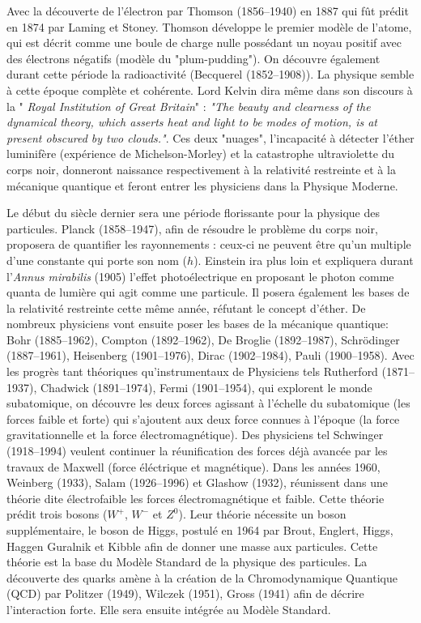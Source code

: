 Avec la découverte de l'électron par Thomson (\num{1856}--\num{1940}) en \num{1887} qui fût prédit en \num{1874} par Laming et Stoney. Thomson développe le premier modèle de l'atome, qui est décrit comme une boule de charge nulle possédant un noyau positif avec des électrons négatifs (modèle du "plum-pudding"). On découvre également durant cette période la radioactivité (Becquerel (\num{1852}--\num{1908})). La physique semble à cette époque complète et cohérente. Lord Kelvin dira même dans son discours à la " \textit{Royal Institution of Great Britain}" : \textit{"The beauty and clearness of the dynamical theory, which asserts heat and light to be modes of motion, is at present obscured by two clouds."}. Ces deux "nuages", l'incapacité à détecter l'éther luminifère  (expérience de Michelson-Morley) et la catastrophe ultraviolette du corps noir, donneront naissance respectivement à la relativité restreinte et à la mécanique quantique et feront entrer les physiciens dans la Physique Moderne.

Le début du siècle dernier sera une période florissante pour la physique des particules. Planck (\num{1858}--\num{1947}), afin de résoudre le problème du corps noir, proposera de quantifier les rayonnements : ceux-ci ne peuvent être qu'un multiple d'une constante qui porte son nom ($h$). Einstein ira plus loin et expliquera durant l'\textit{Annus mirabilis} (\num{1905}) l'effet photoélectrique en proposant le photon comme quanta de lumière qui agit comme une particule. Il posera également les bases de la relativité restreinte cette même année, réfutant le concept d'éther. De nombreux physiciens vont ensuite poser les bases de la mécanique quantique: Bohr (\num{1885}--\num{1962}), Compton (\num{1892}--\num{1962}), De Broglie (\num{1892}--\num{1987}), Schrödinger (\num{1887}--\num{1961}), Heisenberg (\num{1901}--\num{1976}), Dirac (\num{1902}--\num{1984}), Pauli (\num{1900}--\num{1958}). Avec les progrès tant théoriques qu'instrumentaux de Physiciens tels  Rutherford (\num{1871}--\num{1937}), Chadwick (\num{1891}--\num{1974}), Fermi (\num{1901}--\num{1954}), qui explorent le monde subatomique, on découvre les deux forces agissant à l'échelle du subatomique (les forces faible et forte) qui s'ajoutent aux deux force connues à l'époque (la force gravitationnelle et la force électromagnétique). Des physiciens tel Schwinger (\num{1918}--\num{1994}) veulent continuer la réunification des forces déjà avancée par les travaux de Maxwell (force éléctrique et magnétique). Dans les années \num{1960}, Weinberg (\num{1933}), Salam (\num{1926}--\num{1996}) et Glashow (\num{1932}), réunissent dans une théorie dite électrofaible les forces électromagnétique et faible. Cette théorie prédit trois bosons ($W^{+}$, $W^{-}$ et $Z^{0}$). Leur théorie nécessite un boson supplémentaire, le boson de Higgs, postulé en \num{1964} par Brout, Englert, Higgs, Haggen Guralnik et Kibble afin de donner une masse aux particules. Cette théorie est la base du Modèle Standard de la physique des particules. La découverte des quarks amène à la création de la Chromodynamique Quantique (QCD) par Politzer (\num{1949}), Wilczek (\num{1951}), Gross (\num{1941}) afin de décrire l'interaction forte. Elle sera ensuite intégrée au Modèle Standard.

